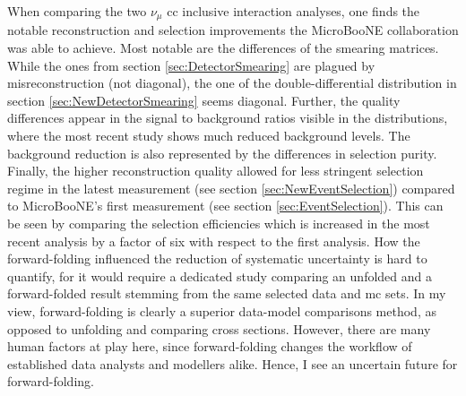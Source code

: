 When comparing the two $\nu_\mu$ \gls{cc} inclusive interaction analyses, one finds the notable reconstruction and selection improvements the MicroBooNE collaboration was able to achieve. Most notable are the differences of the smearing matrices. While the ones from section \ref{sec:DetectorSmearing} are plagued by misreconstruction (not diagonal), the one of the double-differential distribution in section \ref{sec:NewDetectorSmearing} seems diagonal. Further, the quality differences appear in the signal to background ratios visible in the distributions, where the most recent study shows much reduced background levels. The background reduction is also represented by the differences in selection purity. Finally, the higher reconstruction quality allowed for less stringent selection regime in the latest measurement (see section \ref{sec:NewEventSelection}) compared to MicroBooNE's first measurement (see section \ref{sec:EventSelection}). This can be seen by comparing the selection efficiencies which is increased in the most recent analysis by a factor of six with respect to the first analysis. How the forward-folding influenced the reduction of systematic uncertainty is hard to quantify, for it would require a dedicated study comparing an unfolded and a forward-folded result stemming from the same selected data and \gls{mc} sets. In my view, forward-folding is clearly a superior data-model comparisons method, as opposed to unfolding and comparing cross sections. However, there are many human factors at play here, since forward-folding changes the workflow of established data analysts and modellers alike. Hence, I see an uncertain future for forward-folding.

